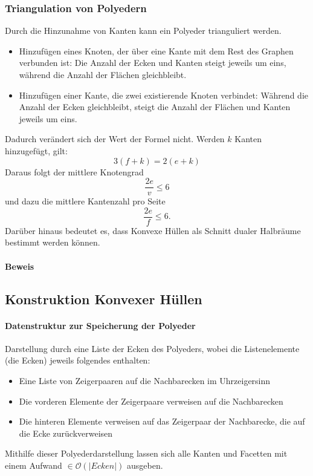 \subsubsection{Triangulation von Polyedern}
Durch die Hinzunahme von Kanten kann ein Polyeder trianguliert werden.
\begin{itemize}
	\item Hinzufügen eines Knoten, der über eine Kante mit dem Rest des Graphen verbunden ist: Die Anzahl der Ecken und Kanten steigt jeweils um eins, während die Anzahl der Flächen gleichbleibt.
	\item Hinzufügen einer Kante, die zwei existierende Knoten verbindet: Während die Anzahl der Ecken gleichbleibt, steigt die Anzahl der Flächen und Kanten jeweils um eins. 
\end{itemize}
Dadurch verändert sich der Wert der Formel nicht. Werden \(k\) Kanten hinzugefügt, gilt:
\[3(f+k) = 2(e+k)\]
Daraus folgt der mittlere Knotengrad
\[\frac{2e}{v} \leq 6\]
und dazu die mittlere Kantenzahl pro Seite
\[\frac{2e}{f} \leq 6.\]
Darüber hinaus bedeutet es, dass Konvexe Hüllen als Schnitt dualer Halbräume bestimmt werden können.

\paragraph{Beweis}

\subsection{Konstruktion Konvexer Hüllen}

\paragraph{Datenstruktur zur Speicherung der Polyeder}
Darstellung durch eine Liste der Ecken des Polyeders, wobei die Listenelemente (die Ecken) jeweils folgendes enthalten:
\begin{itemize}
	\item Eine Liste von Zeigerpaaren auf die Nachbarecken im Uhrzeigersinn
	\item Die vorderen Elemente der Zeigerpaare verweisen auf die Nachbarecken
	\item Die hinteren Elemente verweisen auf das Zeigerpaar der Nachbarecke, die auf die Ecke zurückverweisen
\end{itemize}
Mithilfe dieser Polyederdarstellung lassen sich alle Kanten und Facetten mit einem Aufwand \(\in \mathcal{O}(|Ecken|)\) ausgeben.
\text{}\\\\




